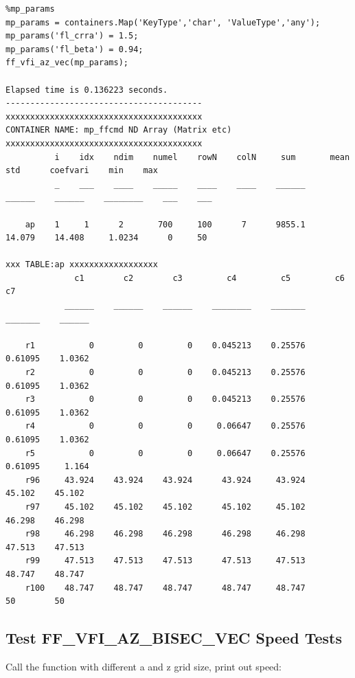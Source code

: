 \documentclass[
]{book}
\begin{document}
\begin{verbatim}
%mp_params
mp_params = containers.Map('KeyType','char', 'ValueType','any');
mp_params('fl_crra') = 1.5;
mp_params('fl_beta') = 0.94;
ff_vfi_az_vec(mp_params);

Elapsed time is 0.136223 seconds.
----------------------------------------
xxxxxxxxxxxxxxxxxxxxxxxxxxxxxxxxxxxxxxxx
CONTAINER NAME: mp_ffcmd ND Array (Matrix etc)
xxxxxxxxxxxxxxxxxxxxxxxxxxxxxxxxxxxxxxxx
          i    idx    ndim    numel    rowN    colN     sum       mean      std      coefvari    min    max
          _    ___    ____    _____    ____    ____    ______    ______    ______    ________    ___    ___

    ap    1     1      2       700     100      7      9855.1    14.079    14.408     1.0234      0     50 

xxx TABLE:ap xxxxxxxxxxxxxxxxxx
              c1        c2        c3         c4         c5         c6         c7  
            ______    ______    ______    ________    _______    _______    ______

    r1           0         0         0    0.045213    0.25576    0.61095    1.0362
    r2           0         0         0    0.045213    0.25576    0.61095    1.0362
    r3           0         0         0    0.045213    0.25576    0.61095    1.0362
    r4           0         0         0     0.06647    0.25576    0.61095    1.0362
    r5           0         0         0     0.06647    0.25576    0.61095     1.164
    r96     43.924    43.924    43.924      43.924     43.924     45.102    45.102
    r97     45.102    45.102    45.102      45.102     45.102     46.298    46.298
    r98     46.298    46.298    46.298      46.298     46.298     47.513    47.513
    r99     47.513    47.513    47.513      47.513     47.513     48.747    48.747
    r100    48.747    48.747    48.747      48.747     48.747         50        50
\end{verbatim}

\hypertarget{test-ff_vfi_az_bisec_vec-speed-tests-1}{%
\subsection{Test FF\_VFI\_AZ\_BISEC\_VEC Speed Tests}\label{test-ff_vfi_az_bisec_vec-speed-tests-1}}

Call the function with different a and z grid size, print out speed:
\end{document}
